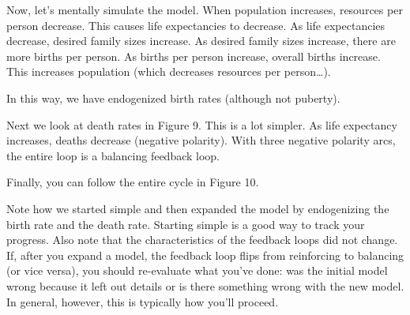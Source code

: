\documentclass[letterpaper,10pt,english]{sphinxmanual}
\begin{document}
\begin{DUlineblock}{0em}
\item[] 
\end{DUlineblock}

Now, let’s mentally simulate the model. When population increases, resources per person decrease. This causes life expectancies to decrease. As life expectancies decrease, desired family sizes increase. As desired family sizes increase, there are more births per person. As births per person increase, overall births increase. This increases population (which decreases resources per person…).

In this way, we have endogenized birth rates (although not puberty).


\begin{DUlineblock}{0em}
\item[] 
\end{DUlineblock}

Next we look at death rates in Figure 9. This is a lot simpler. As life expectancy increases, deaths decrease (negative polarity). With three negative polarity arcs, the entire loop is a balancing feedback loop.


\begin{DUlineblock}{0em}
\item[] 
\end{DUlineblock}

Finally, you can follow the entire cycle in Figure 10.


\begin{DUlineblock}{0em}
\item[] 
\end{DUlineblock}

Note how we started simple and then expanded the model by endogenizing the birth rate and the death rate. Starting simple is a good way to track your progress. Also note that the characteristics of the feedback loops did not change. If, after you expand a model, the feedback loop flips from reinforcing to balancing (or vice versa), you should re-evaluate what you’ve done: was the initial model wrong because it left out details or is there something wrong with the new model. In general, however,
this is typically how you’ll proceed.
\end{document}
